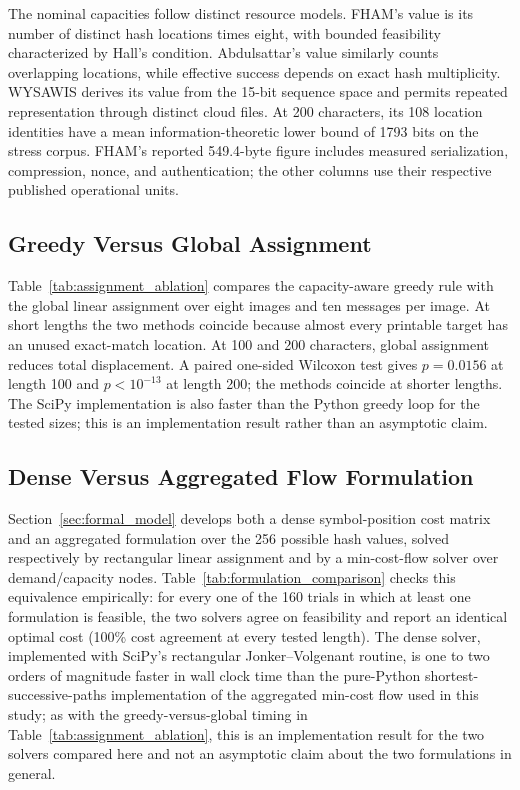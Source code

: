 \documentclass[preprint,12pt]{elsarticle}
\theoremstyle{plain}
\begin{document}
The nominal capacities follow distinct resource models. FHAM's value is its
number of distinct hash locations times eight, with bounded feasibility
characterized by Hall's condition. Abdulsattar's value similarly counts
overlapping locations, while effective success depends on exact hash
multiplicity. WYSAWIS derives its value from the 15-bit sequence space and
permits repeated representation through distinct cloud files. At 200
characters, its 108 location identities have a mean information-theoretic
lower bound of 1793 bits on the stress corpus. FHAM's reported 549.4-byte
figure includes measured serialization, compression, nonce, and
authentication; the other columns use their respective published operational
units.

\subsection{Greedy Versus Global Assignment}

Table~\ref{tab:assignment_ablation} compares the capacity-aware greedy rule
with the global linear assignment over eight images and ten messages per image.
At short lengths the two methods coincide because almost every printable target
has an unused exact-match location. At 100 and 200 characters, global
assignment reduces total displacement. A paired one-sided Wilcoxon test gives
$p=0.0156$ at length 100 and $p<10^{-13}$ at length 200; the methods coincide
at shorter lengths. The SciPy implementation is also faster
than the Python greedy loop for the tested sizes; this is an implementation
result rather than an asymptotic claim.

\begin{table}[!t]
\centering
\caption{Assignment Ablation: Mean Total Displacement and Assignment Time}
\label{tab:assignment_ablation}

\end{table}

\subsection{Dense Versus Aggregated Flow Formulation}

Section~\ref{sec:formal_model} develops both a dense symbol-position cost
matrix and an aggregated formulation over the 256 possible hash values,
solved respectively by rectangular linear assignment and by a min-cost-flow
solver over demand/capacity nodes. Table~\ref{tab:formulation_comparison}
checks this equivalence empirically: for every one of the 160 trials in which
at least one formulation is feasible, the two solvers agree on feasibility
and report an identical optimal cost (100\% cost agreement at every tested
length). The dense solver, implemented with SciPy's rectangular
Jonker--Volgenant routine, is one to two orders of magnitude faster in wall
clock time than the pure-Python shortest-successive-paths implementation of
the aggregated min-cost flow used in this study; as with the greedy-versus-global
timing in Table~\ref{tab:assignment_ablation}, this is an implementation
result for the two solvers compared here and not an asymptotic claim about
the two formulations in general.
\end{document}
